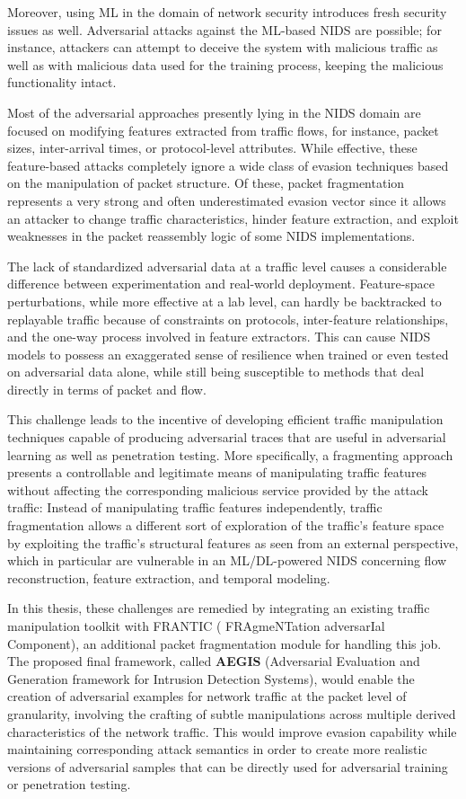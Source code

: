 Moreover, using ML in the domain of network security introduces fresh security issues as well. Adversarial attacks against the ML-based NIDS are possible; for instance, attackers can attempt to deceive the system with malicious traffic as well as with malicious data used for the training process, keeping the malicious functionality intact.

Most of the adversarial approaches presently lying in the NIDS domain are focused on modifying features extracted from traffic flows, for instance, packet sizes, inter-arrival times, or protocol-level attributes. While effective, these feature-based attacks completely ignore a wide class of evasion techniques based on the manipulation of packet structure. Of these, packet fragmentation represents a very strong and often underestimated evasion vector since it allows an attacker to change traffic characteristics, hinder feature extraction, and exploit weaknesses in the packet reassembly logic of some NIDS implementations.

The lack of standardized adversarial data at a traffic level causes a considerable difference between experimentation and real-world deployment. Feature-space perturbations, while more effective at a lab level, can hardly be backtracked to replayable traffic because of constraints on protocols, inter-feature relationships, and the one-way process involved in feature extractors. This can cause NIDS models to possess an exaggerated sense of resilience when trained or even tested on adversarial data alone, while still being susceptible to methods that deal directly in terms of packet and flow.

This challenge leads to the incentive of developing efficient traffic manipulation techniques capable of producing adversarial traces that are useful in adversarial learning as well as penetration testing. More specifically, a fragmenting approach presents a controllable and legitimate means of manipulating traffic features without affecting the corresponding malicious service provided by the attack traffic: Instead of manipulating traffic features independently, traffic fragmentation allows a different sort of exploration of the traffic’s feature space by exploiting the traffic’s structural features as seen from an external perspective, which in particular are vulnerable in an ML/DL-powered NIDS concerning flow reconstruction, feature extraction, and temporal modeling.

In this thesis, these challenges are remedied by integrating an existing traffic manipulation toolkit with FRANTIC ( FRAgmeNTation adversarIal Component), an additional packet fragmentation module for handling this job. The proposed final framework, called \textbf{AEGIS} (Adversarial Evaluation and Generation framework for Intrusion Detection Systems), would enable the creation of adversarial examples for network traffic at the packet level of granularity, involving the crafting of subtle manipulations across multiple derived characteristics of the network traffic. This would improve evasion capability while maintaining corresponding attack semantics in order to create more realistic versions of adversarial samples that can be directly used for adversarial training or penetration testing.

